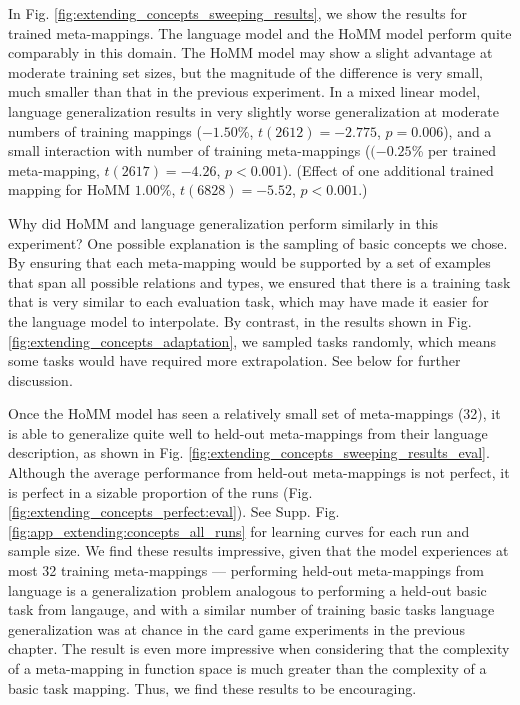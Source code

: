 In Fig. \ref{fig:extending_concepts_sweeping_results}, we show the results for trained meta-mappings. The language model and the HoMM model perform quite comparably in this domain. The HoMM model may show a slight advantage at moderate training set sizes, but the magnitude of the difference is very small, much smaller than that in the previous experiment. In a mixed linear model, language generalization results in very slightly worse generalization at moderate numbers of training mappings (\(-1.50\)\%, \(t(2612) = -2.775\), \(p =0.006\)), and a small interaction with number of training meta-mappings (\((-0.25\)\% per trained meta-mapping,  \(t(2617) = -4.26\), \(p < 0.001\)). (Effect of one additional trained mapping for HoMM \(1.00\)\%, \(t(6828) = -5.52\), \(p < 0.001\).) \par

Why did HoMM and language generalization perform similarly in this experiment? One possible explanation is the sampling of basic concepts we chose. By ensuring that each meta-mapping would be supported by a set of examples that span all possible relations and types, we ensured that there is a training task that is very similar to each evaluation task, which may have made it easier for the language model to interpolate. By contrast, in the results shown in Fig. \ref{fig:extending_concepts_adaptation}, we sampled tasks randomly, which means some tasks would have required more extrapolation. See below for further discussion.\par

Once the HoMM model has seen a relatively small set of meta-mappings (32), it is able to generalize quite well to held-out meta-mappings from their language description, as shown in Fig. \ref{fig:extending_concepts_sweeping_results_eval}. Although the average performance from held-out meta-mappings is not perfect, it is perfect in a sizable proportion of the runs (Fig. \ref{fig:extending_concepts_perfect:eval}). See Supp. Fig. \ref{fig:app_extending:concepts_all_runs} for learning curves for each run and sample size. We find these results impressive, given that the model experiences at most 32 training meta-mappings --- performing held-out meta-mappings from language is a generalization problem analogous to performing a held-out basic task from langauge, and with a similar number of training basic tasks language generalization was at chance in the card game experiments in the previous chapter. The result is even more impressive when considering that the complexity of a meta-mapping in function space is much greater than the complexity of a basic task mapping. Thus, we find these results to be encouraging.\par

